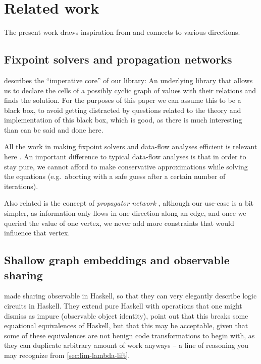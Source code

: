 \documentclass[manuscript,review,screen,acmsmall]{acmart}
\begin{document}
\section{Related work}\label{sec:related}

The present work draws inspiration from and connects to various directions.

\subsection{Fixpoint solvers and propagation networks}

 describes the “imperative core” of our library: An underlying library that allows us to declare the cells of a possibly cyclic graph of values with their relations and finds the solution. For the purposes of this paper we can assume this to be a black box, to avoid getting distracted by questions related to the theory and implementation of this black box, which is good, as there is much interesting than can be said and done here.

All the work in making fixpoint solvers and data-flow analyses efficient is relevant here \citep{kildall-73,kam-ullman-76}. An important difference to typical data-flow analyses is that in order to stay pure, we cannot afford to make conservative approximations while solving the equations (e.g.\ aborting with a safe guess after a certain number of iterations).

Also related is the concept of \emph{propagator network} \citep{propagator}, although our use-case is a bit simpler, as information only flows in one direction along an edge, and once we queried the value of one vertex, we never add more constraints that would influence that vertex.

%

\subsection{Shallow graph embeddings and observable sharing}

 made sharing observable in Haskell, so that they can very elegantly describe logic circuits in Haskell. They extend pure Haskell with operations that one might dismiss as impure (observable object identity), point out that this breaks some equational equivalences of Haskell, but that this may be acceptable, given that some of these equivalences  are not benign code transformations to begin with, as they can duplicate arbitrary amount of work anyways -- a line of reasoning you may recognize from \cref{sec:lim-lambda-lift}.
\end{document}
